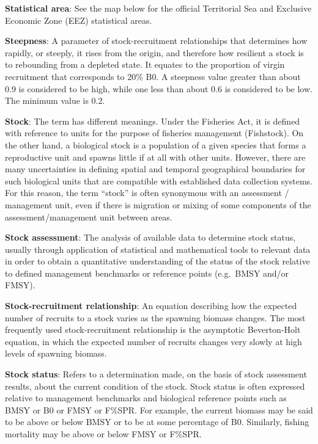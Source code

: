\documentclass{mpi-plenary}
\theoremstyle{definition}
\theoremstyle{definition}
\theoremstyle{definition}
\theoremstyle{remark}
\begin{document}
\protect\hypertarget{def-statistical-area}{}{} \textbf{Statistical
area}: See the map below for the official Territorial Sea and Exclusive
Economic Zone (EEZ) statistical areas.

\protect\hypertarget{def-steepness}{}{} \textbf{Steepness}: A parameter
of stock-recruitment relationships that determines how rapidly, or
steeply, it rises from the origin, and therefore how resilient a stock
is to rebounding from a depleted state. It equates to the proportion of
virgin recruitment that corresponds to 20\% B0. A steepness value
greater than about 0.9 is considered to be high, while one less than
about 0.6 is considered to be low. The minimum value is 0.2.

\protect\hypertarget{def-stock}{}{} \textbf{Stock}: The term has
different meanings. Under the Fisheries Act, it is defined with
reference to units for the purpose of fisheries management (Fishstock).
On the other hand, a biological stock is a population of a given species
that forms a reproductive unit and spawns little if at all with other
units. However, there are many uncertainties in defining spatial and
temporal geographical boundaries for such biological units that are
compatible with established data collection systems. For this reason,
the term ``stock'' is often synonymous with an assessment / management
unit, even if there is migration or mixing of some components of the
assessment/management unit between areas.

\protect\hypertarget{def-stock-assessment}{}{} \textbf{Stock
assessment}: The analysis of available data to determine stock status,
usually through application of statistical and mathematical tools to
relevant data in order to obtain a quantitative understanding of the
status of the stock relative to defined management benchmarks or
reference points (e.g.~BMSY and/or FMSY).

\protect\hypertarget{def-stock-recruitment-relationship}{}{}
\textbf{Stock-recruitment relationship}: An equation describing how the
expected number of recruits to a stock varies as the spawning biomass
changes. The most frequently used stock-recruitment relationship is the
asymptotic Beverton-Holt equation, in which the expected number of
recruits changes very slowly at high levels of spawning biomass.

\protect\hypertarget{def-stock-status}{}{} \textbf{Stock status}: Refers
to a determination made, on the basis of stock assessment results, about
the current condition of the stock. Stock status is often expressed
relative to management benchmarks and biological reference points such
as BMSY or B0 or FMSY or F\%SPR. For example, the current biomass may be
said to be above or below BMSY or to be at some percentage of B0.
Similarly, fishing mortality may be above or below FMSY or F\%SPR.
\end{document}
